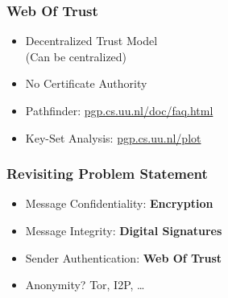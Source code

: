 \documentclass{beamer}
\begin{document}



\begin{frame}


	\frametitle{Web Of Trust}

	\begin{itemize}
		\item Decentralized Trust Model \\ (Can be centralized)
		\item No Certificate Authority
	\end{itemize}	
	
	\begin{itemize}
		\item Pathfinder:          \url{pgp.cs.uu.nl/doc/faq.html}
		\item Key-Set Analysis: \url{pgp.cs.uu.nl/plot}
	\end{itemize}

\end{frame}


\begin{frame}
	\frametitle{Revisiting Problem Statement}

	\begin{itemize}
		\item Message Confidentiality: \textbf{Encryption} 
		\item Message Integrity:          \textbf{Digital Signatures} 
		\item Sender Authentication:    	\textbf{Web Of Trust}
		\item Anonymity? Tor, I2P, \ldots
	\end{itemize}


\end{frame}
\end{document}

